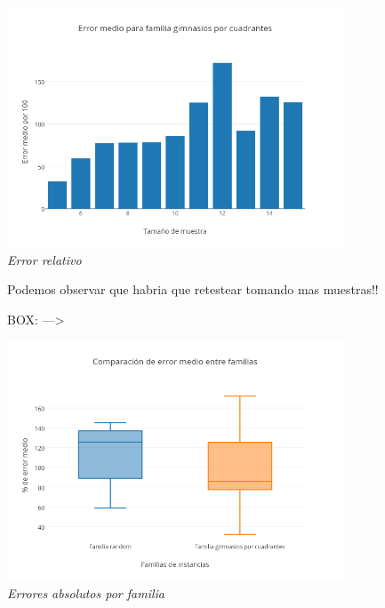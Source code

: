\vspace*{0.3cm} \vspace*{0.3cm}
  \begin{center}
 \includegraphics[width=0.75\textwidth]{./EJ2/familiaError.png}
\\{\textit{Error relativo}}
\end{center}

Podemos observar que habria que retestear tomando mas muestras!!

BOX: --->

\vspace*{0.3cm} \vspace*{0.3cm}
  \begin{center}
 \includegraphics[width=0.75\textwidth]{./EJ2/box2.png}
\\{\textit{Errores absolutos por familia}}
\end{center}
